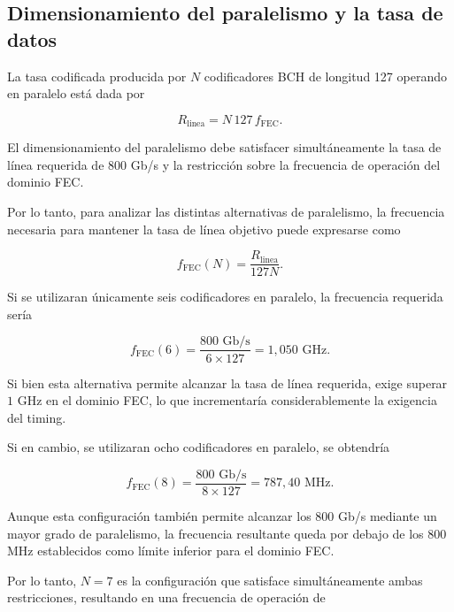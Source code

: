 \documentclass[10pt,a4paper]{article}
\begin{document}
\subsection{Dimensionamiento del paralelismo y la tasa de datos}

La tasa codificada producida por $N$ codificadores BCH de longitud 127
operando en paralelo está dada por

\begin{equation}
    R_{\mathrm{linea}} = N\,127\,f_{\mathrm{FEC}}.
    \label{eq:tasa-linea}
\end{equation}

El dimensionamiento del paralelismo debe satisfacer simultáneamente la tasa
de línea requerida de $800$ Gb/s y la restricción sobre la frecuencia de
operación del dominio FEC.

Por lo tanto, para analizar las distintas alternativas de paralelismo, la
frecuencia necesaria para mantener la tasa de línea objetivo puede expresarse
como

\begin{equation}
    f_{\mathrm{FEC}}(N)
    =
    \frac{R_{\mathrm{linea}}}{127N}.
    \label{eq:fec-freq-N}
\end{equation}

Si se utilizaran únicamente seis codificadores en paralelo, la frecuencia
requerida sería

\begin{equation}
    f_{\mathrm{FEC}}(6)
    =
    \frac{800\text{ Gb/s}}{6\times127}
    =
    1{,}050\text{ GHz}.
\end{equation}

Si bien esta alternativa permite alcanzar la tasa de línea requerida, exige
superar $1$ GHz en el dominio FEC, lo que incrementaría considerablemente
la exigencia del timing.

Si en cambio, se utilizaran ocho codificadores en paralelo, se obtendría

\begin{equation}
    f_{\mathrm{FEC}}(8)
    =
    \frac{800\text{ Gb/s}}{8\times127}
    =
    787{,}40\text{ MHz}.
\end{equation}

Aunque esta configuración también permite alcanzar los $800$ Gb/s mediante
un mayor grado de paralelismo, la frecuencia resultante queda por debajo de
los $800$ MHz establecidos como límite inferior para el dominio FEC.

Por lo tanto, $N=7$ es la configuración que satisface simultáneamente ambas
restricciones, resultando en una frecuencia de operación de
\end{document}
